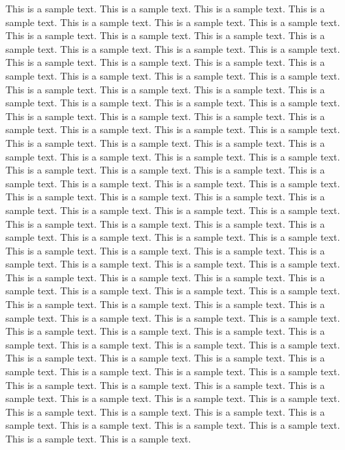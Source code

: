 This is a sample text.
This is a sample text.
This is a sample text.
This is a sample text.
This is a sample text.
This is a sample text.
This is a sample text.
This is a sample text.
This is a sample text.
This is a sample text.
This is a sample text.
This is a sample text.
This is a sample text.
This is a sample text.
This is a sample text.
This is a sample text.
This is a sample text.
This is a sample text.
This is a sample text.
This is a sample text.
This is a sample text.
This is a sample text.
This is a sample text.
This is a sample text.
This is a sample text.
This is a sample text.
This is a sample text.
This is a sample text.
This is a sample text.
This is a sample text.
This is a sample text.
This is a sample text.
This is a sample text.
This is a sample text.
This is a sample text.
This is a sample text.
This is a sample text.
This is a sample text.
This is a sample text.
This is a sample text.
This is a sample text.
This is a sample text.
This is a sample text.
This is a sample text.
This is a sample text.
This is a sample text.
This is a sample text.
This is a sample text.
This is a sample text.
This is a sample text.
This is a sample text.
This is a sample text.
This is a sample text.
This is a sample text.
This is a sample text.
This is a sample text.
This is a sample text.
This is a sample text.
This is a sample text.
This is a sample text.
This is a sample text.
This is a sample text.
This is a sample text.
This is a sample text.
This is a sample text.
This is a sample text.
This is a sample text.
This is a sample text.
This is a sample text.
This is a sample text.
This is a sample text.
This is a sample text.
This is a sample text.
This is a sample text.
This is a sample text.
This is a sample text.
This is a sample text.
This is a sample text.
This is a sample text.
This is a sample text.
This is a sample text.
This is a sample text.
This is a sample text.
This is a sample text.
This is a sample text.
This is a sample text.
This is a sample text.
This is a sample text.
This is a sample text.
This is a sample text.
This is a sample text.
This is a sample text.
This is a sample text.
This is a sample text.
This is a sample text.
This is a sample text.
This is a sample text.
This is a sample text.
This is a sample text.
This is a sample text.
This is a sample text.
This is a sample text.
This is a sample text.
This is a sample text.
This is a sample text.
This is a sample text.
This is a sample text.
This is a sample text.
This is a sample text.
This is a sample text.
This is a sample text.
This is a sample text.
This is a sample text.
This is a sample text.
